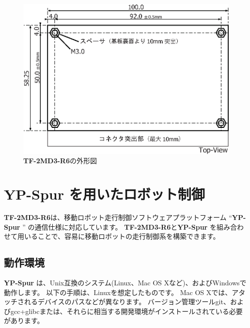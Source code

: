 \documentclass[11pt,a4j,openany]{jbook}
\begin{document}
\begin{figure}[H]
\centering\includegraphics[width=130mm]{shape.eps}
\caption{{\bf TF-2MD3-R6}の外形図}
\label{fig:shape}
\end{figure}



\newpage
\section{{\bf YP-Spur} を用いたロボット制御}
\label{sec:YP-Spur}

{\bf TF-2MD3-R6}は、移動ロボット走行制御ソフトウェアプラットフォーム ``{\bf YP-Spur} '' の通信仕様に対応しています。
{\bf TF-2MD3-R6}と{\bf YP-Spur} を組み合わせて用いることで、容易に移動ロボットの走行制御系を構築できます。

\subsection{動作環境}

{\bf YP-Spur} は、Unix互換のシステム(Linux、Mac OS Xなど)、およびWindowsで動作します。
以下の手順は、Linuxを想定したものです。
Mac OS Xでは、アタッチされるデバイスのパスなどが異なります。
バージョン管理ツールgit、およびgcc+glibcまたは、それらに相当する開発環境がインストールされている必要があります。\par
\end{document}
